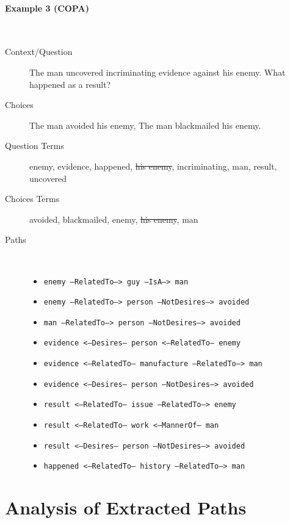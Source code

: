 \documentclass{article}
\begin{document}
\paragraph{Example 3 (COPA)}

\,


\begin{description}
\item[Context/Question] The man uncovered incriminating evidence
  against his enemy. What happened as a result?
\item[Choices] The man avoided his enemy, The man blackmailed his enemy.
\item[Question Terms] enemy, evidence, happened, \st{his enemy},
  incriminating, man, result, uncovered
  
\item[Choices Terms] avoided, blackmailed, enemy, \st{his enemy}, man

  
\item[Paths] \,

  \begin{itemize}
  \item \texttt{enemy --RelatedTo--> guy --IsA--> man}
  \item \texttt{enemy --RelatedTo--> person --NotDesires--> avoided}
  \item \texttt{man --RelatedTo--> person --NotDesires--> avoided}
  \item \texttt{evidence <--Desires-- person <--RelatedTo-- enemy}
  \item \texttt{evidence <--RelatedTo-- manufacture --RelatedTo--> man}
  \item \texttt{evidence <--Desires-- person --NotDesires--> avoided}
  \item \texttt{result <--RelatedTo-- issue --RelatedTo--> enemy}
  \item \texttt{result <--RelatedTo-- work <--MannerOf-- man}
  \item \texttt{result <--Desires-- person --NotDesires--> avoided}
  \item \texttt{happened <--RelatedTo-- history --RelatedTo--> man}
   
  \end{itemize}

\end{description}





\section{Analysis of Extracted Paths}
\label{sec:step-3:-analyze}
\end{document}
